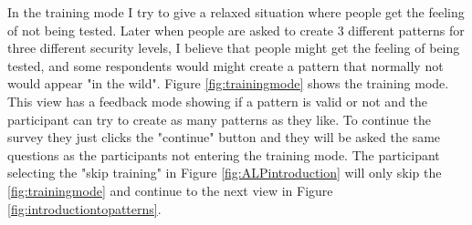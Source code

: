       In the training mode I try to give a relaxed situation where people get the feeling of not being tested. Later when people are asked to create 3 different patterns for three different security levels, I believe that people might get the feeling of being tested, and some respondents would might create a pattern that normally not would appear "in the wild". Figure \ref{fig:trainingmode} shows the training mode. This view has a feedback mode showing if a pattern is valid or not and the participant can try to create as many patterns as they like. To continue the survey they just clicks the "continue" button and they will be asked the same questions as the participants not entering the training mode. The participant selecting the "skip training" in Figure \ref{fig:ALPintroduction} will only skip the \ref{fig:trainingmode} and continue to the next view in Figure \ref{fig:introductiontopatterns}.

